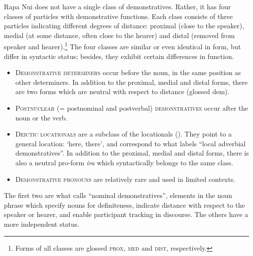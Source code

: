 Rapa Nui does not have a single class of demonstratives. Rather, it has four classes of particles with demonstrative functions. Each class consists of three particles indicating different degrees of distance: proximal (close to the speaker), medial (at some distance, often close to the hearer) and distal (removed from speaker and hearer).\footnote{\label{fn:209}Forms of all classes are glossed \textsc{prox}, \textsc{med} and \textsc{dist}, respectively.} The four classes are similar or even identical in form, but differ in syntactic status; besides, they exhibit certain differences in function. 

\begin{itemize}
\item 
\textsc{Demonstrative determiners} occur before the noun, in the same position as other determiners. In addition to the proximal, medial and distal forms, there are two forms which are neutral with respect to distance (glossed dem).

\item 
\textsc{Postnuclear} (= postnominal and postverbal) \textsc{demonstratives} occur after the noun or the verb.

\item 
\textsc{Deictic locationals} are a subclass of the locationals (). They point to a general location: ‘here, there’, and correspond to what \citet[228]{Dixon2010-2} labels “local adverbial demonstratives”. In addition to the proximal, medial and distal forms, there is also a neutral pro-form \textit{ira} which syntactically belongs to the same class.

\item 
\textsc{Demonstrative pronouns} are relatively rare and used in limited contexts. 

\end{itemize}

The first two are what \citet[225]{Dixon2010-2} calls “nominal demonstratives”, elements in the noun phrase which specify nouns for definiteness, indicate distance with respect to the speaker or hearer, and enable participant tracking in discourse. The others have a more independent status.

